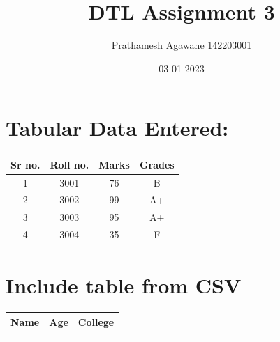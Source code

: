 \documentclass[a4paper,12pt,oneside,article]{article}
\title{DTL Assignment 3}
\author{Prathamesh Agawane 142203001}
\date{03-01-2023}
\begin{document}
\maketitle
\newpage

\vspace{1cm}
\section{Tabular Data Entered:}


\begin{center}
\begin{tabular}{ |c|c|c|c| } 



\hline


\textbf{Sr no.   }&
\textbf{Roll no.   }&
\textbf{Marks }&
\textbf{Grades  }\\


 \hline
1  &  3001  &  76 & B \\
2  &  3002  & 99 & A+ \\
3  &  3003  &  95  & A+ \\
4  &  3004  &  35  & F \\

 \hline

\end{tabular}
\end{center}		

\newpage
\section{Include table from CSV}
				\begin{Center}
					
			
	\begin{tabular}{|c|c|c|}%
	\hline
	\bfseries Name & \bfseries Age & \bfseries College
	\csvreader[head to column names]{Book1.csv}{}
	{\\\hline\csvcoli&\csvcolii&\csvcoliii}\\
	\hline
	\end{tabular}	
	\end{Center}		
\end{document}
